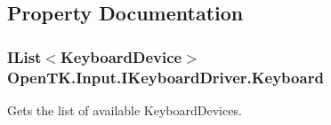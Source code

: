 \subsection{Property Documentation}
\hypertarget{interface_open_t_k_1_1_input_1_1_i_keyboard_driver_a2181af987484d7afd98fbd8266c7940b}{
\subsubsection[{Keyboard}]{\setlength{\rightskip}{0pt plus 5cm}I\-List$<${\bf Keyboard\-Device}$>$ Open\-T\-K.\-Input.\-I\-Keyboard\-Driver.\-Keyboard\hspace{0.3cm}{\ttfamily [get]}}}\label{interface_open_t_k_1_1_input_1_1_i_keyboard_driver_a2181af987484d7afd98fbd8266c7940b}


Gets the list of available Keyboard\-Devices. 

